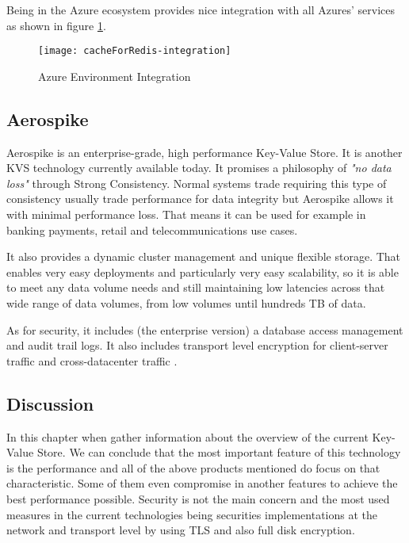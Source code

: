Being in the Azure ecosystem provides nice integration with all Azures' services as shown in figure \ref{fig:azure_ecosystem}.

\begin{figure}[htbp]
	\centering
	{\texttt{[image: cacheForRedis-integration]}}%
	\caption{Azure Environment Integration}
	\label{fig:azure_ecosystem}
\end{figure}

\subsection{Aerospike}
\label{ssec:aerospike}

Aerospike \cite{aerospike:1} is an enterprise-grade, high performance Key-Value Store. It is another \gls{KVS} technology currently available today. It promises a philosophy of \textit{"no data loss" } through Strong Consistency. Normal systems trade requiring this type of consistency usually trade performance for data integrity but Aerospike allows it  with minimal performance loss. That means it can be used for example in banking payments, retail and telecommunications use cases.

It also provides a dynamic cluster management and unique flexible storage. That enables very easy deployments and particularly very easy scalability, so it is able to meet any data volume needs and still maintaining low latencies across that wide range of data volumes, from low volumes until hundreds \gls{TB} of data.

As for security, it includes (the enterprise version) a database access management and audit trail logs. It also includes transport level encryption for client-server traffic and cross-datacenter traffic \cite{aerospike:2}.

\subsection{Discussion}
\label{ssec:s1_discussion}

In this chapter when gather information about the overview of the current Key-Value Store. We can conclude that the most important feature of this technology is the performance and all of the above products mentioned do focus on that characteristic. Some of them even compromise in another features to achieve the best performance possible. Security is not the main concern and the most used measures in the current technologies being securities implementations at the network and transport level by using \gls{TLS} and also full disk encryption. 

